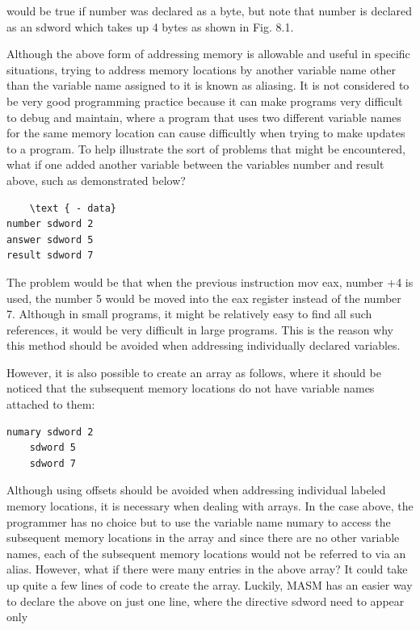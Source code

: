 \documentclass[10pt]{book}
\begin{document}
would be true if number was declared as a byte, but note that number is declared as an sdword which takes up 4 bytes as shown in Fig. 8.1.

Although the above form of addressing memory is allowable and useful in specific situations, trying to address memory locations by another variable name other than the variable name assigned to it is known as aliasing. It is not considered to be very good programming practice because it can make programs very difficult to debug and maintain, where a program that uses two different variable names for the same memory location can cause difficultly when trying to make updates to a program. To help illustrate the sort of problems that might be encountered, what if one added another variable between the variables number and result above, such as demonstrated below?

\begin{verbatim}
    \text { - data}
number sdword 2
answer sdword 5
result sdword 7
\end{verbatim}

The problem would be that when the previous instruction mov eax, number +4 is used, the number 5 would be moved into the eax register instead of the number 7. Although in small programs, it might be relatively easy to find all such references, it would be very difficult in large programs. This is the reason why this method should be avoided when addressing individually declared variables.

However, it is also possible to create an array as follows, where it should be noticed that the subsequent memory locations do not have variable names attached to them:

\begin{verbatim}
numary sdword 2
    sdword 5
    sdword 7
\end{verbatim}

Although using offsets should be avoided when addressing individual labeled memory locations, it is necessary when dealing with arrays. In the case above, the programmer has no choice but to use the variable name numary to access the subsequent memory locations in the array and since there are no other variable names, each of the subsequent memory locations would not be referred to via an alias. However, what if there were many entries in the above array? It could take up quite a few lines of code to create the array. Luckily, MASM has an easier way to declare the above on just one line, where the directive sdword need to appear only
\end{document}
